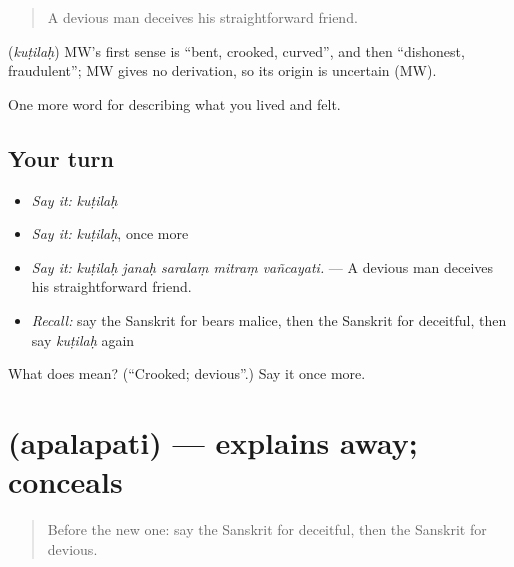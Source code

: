 \begin{quote}
A devious man deceives his straightforward friend.
\end{quote}

\begin{cousinweb}
\textbf{} (\emph{kuṭilaḥ}) MW's first sense is \textquotedblleft{}bent, crooked, curved\textquotedblright{}, and then \textquotedblleft{}dishonest, fraudulent\textquotedblright{}; MW gives no derivation, so its origin is uncertain (MW).
\end{cousinweb}

\begin{grammarlens}[title={What you've built}]
One more word for describing what you lived and felt.
\end{grammarlens}

\subsection*{Your turn}
\begin{itemize}
\raggedright
  \item \emph{Say it:} \emph{kuṭilaḥ}
  \item \emph{Say it:} \emph{kuṭilaḥ}, once more
  \item \emph{Say it:} \emph{kuṭilaḥ janaḥ saralaṃ mitraṃ vañcayati.} — A devious man deceives his straightforward friend.
  \item \emph{Recall:} say the Sanskrit for bears malice, then the Sanskrit for deceitful, then say \emph{kuṭilaḥ} again
\end{itemize}

\begin{tcolorbox}[breakable,colback=teal!4,colframe=teal!35!black,title={Before you move on}]
What does  mean? (\textquotedblleft{}Crooked; devious\textquotedblright{}.) Say it once more.
\end{tcolorbox}
\section[\texorpdfstring{\sk{अपलपति} (apalapati)}{अपलपति (apalapati)}]{ (apalapati) — explains away; conceals}

\label{lesson:SA-C462-apalapati}



\begin{quote}
Before the new one: say the Sanskrit for deceitful, then the Sanskrit for devious.
\end{quote}


